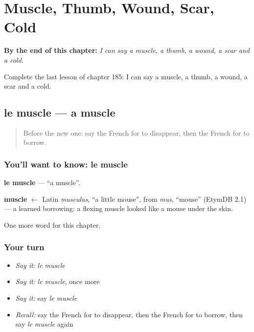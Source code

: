 
\chapter{Muscle, Thumb, Wound, Scar, Cold}
\label{ch:fr-muscle-thumb-wound-scar-cold}

\begin{chapteropening}
\textbf{By the end of this chapter:} \emph{I can say a muscle, a thumb, a wound, a scar and a cold.}

Complete the last lesson of chapter 185: I can say a muscle, a thumb, a wound, a scar and a cold.
\end{chapteropening}

\section[le muscle]{le muscle — a muscle}

\label{lesson:FR-C185-muscle}



\begin{quote}
Before the new one: say the French for to disappear, then the French for to borrow.
\end{quote}

\subsection*{You'll want to know: le muscle}
\textbf{le muscle} — \textquotedblleft{}a muscle\textquotedblright{}.

\begin{cousinweb}
\textbf{muscle} $\leftarrow$ Latin \emph{musculus}, \textquotedblleft{}a little mouse\textquotedblright{}, from \emph{mus}, \textquotedblleft{}mouse\textquotedblright{} (EtymDB 2.1) — a learned borrowing: a flexing muscle looked like a mouse under the skin.
\end{cousinweb}

\begin{grammarlens}[title={What you've built}]
One more word for this chapter.
\end{grammarlens}

\subsection*{Your turn}
\begin{itemize}
\raggedright
  \item \emph{Say it:} \emph{le muscle}
  \item \emph{Say it:} \emph{le muscle}, once more
  \item \emph{Say it:} say \emph{le muscle}
  \item \emph{Recall:} say the French for to disappear, then the French for to borrow, then say \emph{le muscle} again
\end{itemize}

